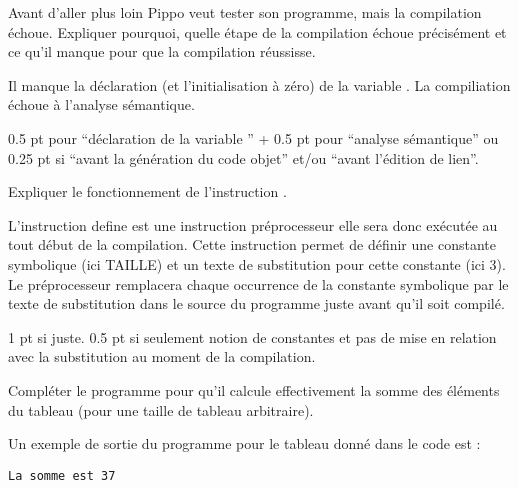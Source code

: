 \question Avant d'aller plus loin Pippo veut tester son programme,
mais la compilation échoue. Expliquer pourquoi, quelle étape de la
compilation échoue précisément et ce qu'il manque pour que la
compilation réussisse.  

\begin{correction}
Il manque la déclaration (et l'initialisation à zéro) de la variable
. La compiliation échoue à l'analyse sémantique. 
\begin{baremeenv}
    0.5 pt pour ``déclaration de la variable '' + 0.5 pt pour
    ``analyse sémantique'' ou 0.25 pt si ``avant la génération du code
    objet'' et/ou ``avant l'édition de lien''.
\end{baremeenv}
\end{correction}

\question Expliquer le fonctionnement de l'instruction .
\begin{correction}
L'instruction define est une instruction préprocesseur elle sera donc
exécutée au tout début de la compilation. Cette instruction permet de
définir une constante symbolique (ici TAILLE) et un texte de
substitution pour cette constante (ici 3). Le préprocesseur remplacera
chaque occurrence de la constante symbolique par le texte de
substitution dans le source du programme juste avant qu'il soit
compilé. 
  \begin{baremeenv}
    1 pt si juste. 0.5 pt si seulement notion de constantes et pas de mise en
  relation avec la substitution au moment de la compilation.
  \end{baremeenv}
\end{correction}


\question Compléter le programme pour qu'il calcule effectivement la somme
  des éléments du tableau (pour une taille de tableau arbitraire).

Un exemple de sortie du programme pour le tableau donné dans le code est :
\begin{verbatim}
La somme est 37
\end{verbatim}

